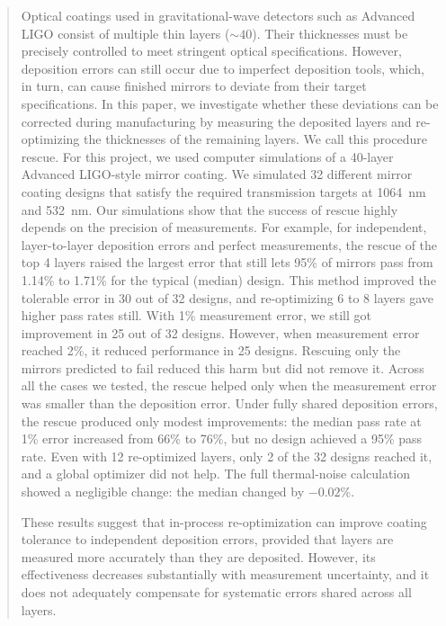 \begin{abstract}
Optical coatings used in gravitational-wave detectors such as Advanced LIGO consist of multiple thin layers (${\sim}40$). Their thicknesses must be precisely controlled to meet stringent optical specifications. However, deposition errors can still occur due to imperfect deposition tools, which, in turn, can cause finished mirrors to deviate from their target specifications. In this paper, we investigate whether these deviations can be corrected during manufacturing by measuring the deposited layers and re-optimizing the thicknesses of the remaining layers. We call this procedure rescue. For this project, we used computer simulations of a 40-layer Advanced LIGO-style mirror coating. We simulated 32 different mirror coating designs that satisfy the required transmission targets at 1064~nm and 532~nm. Our simulations show that the success of rescue highly depends on the precision of measurements. For example, for independent, layer-to-layer deposition errors and perfect measurements, the rescue of the top 4 layers raised the largest error that still lets 95\% of mirrors pass from 1.14\% to 1.71\% for the typical (median) design. This method improved the tolerable error in 30 out of 32 designs, and re-optimizing 6 to 8 layers gave higher pass rates still. With 1\% measurement error, we still got improvement in 25 out of 32 designs. However, when measurement error reached 2\%, it reduced performance in 25 designs. Rescuing only the mirrors predicted to fail reduced this harm but did not remove it. Across all the cases we tested, the rescue helped only when the measurement error was smaller than the deposition error. Under fully shared deposition errors, the rescue produced only modest improvements: the median pass rate at 1\% error increased from 66\% to 76\%, but no design achieved a 95\% pass rate. Even with 12 re-optimized layers, only 2 of the 32 designs reached it, and a global optimizer did not help. The full thermal-noise calculation showed a negligible change: the median changed by $-0.02\%$.

These results suggest that in-process re-optimization can improve coating tolerance to independent deposition errors, provided that layers are measured more accurately than they are deposited. However, its effectiveness decreases substantially with measurement uncertainty, and it does not adequately compensate for systematic errors shared across all layers.
\end{abstract}

